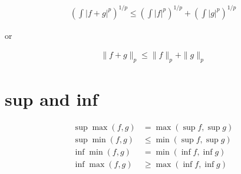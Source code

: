 \documentclass[11pt,a4paper]{article}
\begin{document}
\begin{align*}
   \left( \int \left| f + g \right|^p \right)^{1/p} \le \left( \int \left| f \right|^p \right)^{1/p} + \left( \int \left| g \right|^p \right)^{1/p}
\end{align*}

or

\begin{align*}
    \| f + g\|_p \le \| f \|_p + \| g \|_p
\end{align*}

\section{sup and inf}

\begin{align*}
    \sup \max (f,g) &= \max (\sup f, \sup g) \\
    \sup \min (f,g) &\le \min (\sup f, \sup g) \\
    \inf \min (f,g) &= \min (\inf f, \inf g) \\
    \inf \max (f,g) &\ge \max (\inf f, \inf g) \\
\end{align*}
\end{document}
